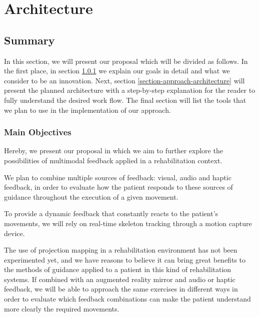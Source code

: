 \chapter{Architecture}
\label{sec:Architecture}
 
\section*{Summary}
 
In this section, we will present our proposal which will be divided as follows. 
In the first place, in section \ref{section-approach-main-objectives} we explain
our goals in detail and what we consider to be an innovation. 
Next, section \ref{section-approach-architecture} will present the planned architecture with a step-by-step 
explanation for the reader to fully understand the desired work flow.
The final section will list the tools that we plan to use in the implementation of our approach.

\subsection{Main Objectives}
\label{section-approach-main-objectives}

Hereby, we present our proposal in which we aim to further explore the possibilities of multimodal 
feedback applied in a rehabilitation context.

We plan to combine multiple sources of feedback: visual, audio and haptic feedback, 
in order to evaluate how the patient responds to these sources of 
guidance throughout the execution of a given movement. 

To provide a dynamic feedback that constantly reacts to the patient's movements, we will rely on real-time skeleton tracking through a motion capture device.

The use of projection mapping in a rehabilitation environment has not been experimented yet, 
and we have reasons to believe it can bring great benefits to the methods of guidance 
applied to a patient in this kind of rehabilitation systems. If combined with an augmented reality mirror 
and audio or haptic feedback, we will be able to approach the same exercises in different ways in order to evaluate which 
feedback combinations can make the patient understand more clearly the required movements.

